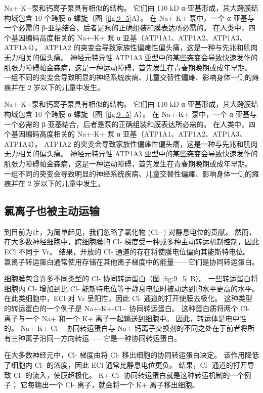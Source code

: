 Na+-K+泵和钙离子泵具有相似的结构。
它们由 110 kD α-亚基形成，其大跨膜结构域包含 10 个跨膜 α-螺旋（图~\ref{fig:9_5}A）。
在 Na+-K+ 泵中，一个 α-亚基与一个必需的 β-亚基结合，后者是泵的正确组装和膜表达所必需的。
在人类中，四个基因编码高度相关的 Na+-K+ 泵 α 亚基（ATP1A1、ATP1A2、ATP1A3、ATP1A4）。
ATP1A2 的突变会导致家族性偏瘫性偏头痛，这是一种与先兆和肌肉无力相关的偏头痛。
神经元特异性 ATP1A3 亚型中的某些突变会导致快速发作的肌张力障碍帕金森病，这是一种运动障碍，首先发生在青春期晚期或成年早期。
一组不同的突变会导致明显的神经系统疾病、儿童交替性偏瘫、影响身体一侧的瘫痪并在 2 岁以下的儿童中发生。


Na+-K+泵和钙离子泵具有相似的结构。
它们由 110 kD α-亚基形成，其大跨膜结构域包含 10 个跨膜 α-螺旋（图~\ref{fig:9_5} A）。
在 Na+-K+ 泵中，一个 α-亚基与一个必需的 β-亚基结合，后者是泵的正确组装和膜表达所必需的。
在人类中，四个基因编码高度相关的 Na+-K+ 泵 α 亚基（ATP1A1、ATP1A2、ATP1A3、ATP1A4）。 ATP1A2 的突变会导致家族性偏瘫性偏头痛，这是一种与先兆和肌肉无力相关的偏头痛。
神经元特异性 ATP1A3 亚型中的某些突变会导致快速发作的肌张力障碍帕金森病，这是一种运动障碍，首先发生在青春期晚期或成年早期。
一组不同的突变会导致明显的神经系统疾病、儿童交替性偏瘫、影响身体一侧的瘫痪并在 2 岁以下的儿童中发生。



\subsection{氯离子也被主动运输}
到目前为止，为简单起见，我们忽略了氯化物 (Cl−) 对静息电位的贡献。 
然而，在大多数神经细胞中，跨细胞膜的 Cl- 梯度受一种或多种主动转运机制控制，因此 ECl 不同于 Vr。 
结果，开放的 Cl- 通道的存在将使膜电位偏向其能斯特电位。 
氯离子转运蛋白通常使用存储在其他离子梯度中的能量——它们是协同转运蛋白。


细胞膜包含许多不同类型的 Cl- 协同转运蛋白（图 \ref{fig:9_5} B）。 
一些转运蛋白将细胞内 Cl- 增加到比 Cl- 能斯特电位等于静息电位时被动达到的水平更高的水平。 
在此类细胞中，ECl 对 Vr 呈阳性，因此 Cl- 通道的打开使膜去极化。 
这种类型的转运蛋白的一个例子是 Na+-K+-Cl− 协同转运蛋白。 
这种蛋白质将两个 Cl- 离子与一个 Na+ 和一个 K+ 离子一起输送到细胞中。 
因此，转运体是电中性的。 
Na+-K+-Cl− 协同转运蛋白与 Na+-钙离子交换剂的不同之处在于前者将所有三种离子沿同一方向转运——它是一种协同转运蛋白。


在大多数神经元中，Cl- 梯度由将 Cl- 移出细胞的协同转运蛋白决定。 
该作用降低了细胞内 Cl- 的浓度，因此 ECl 通常比静息电位更负。 
结果，Cl- 通道的打开导致 Cl- 的流入，使膜超极化。 
K+-Cl- 协同转运蛋白就是这种转运机制的一个例子； 它每输出一个 Cl- 离子，就会将一个 K+ 离子移出细胞。


